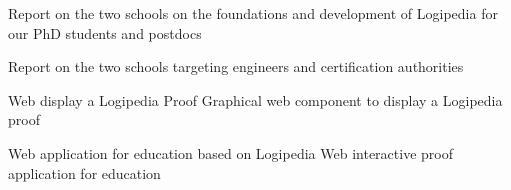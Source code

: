 \begin{workpackage}[id=dissemination,type=MGT,
  short={Dissemination},
  title={Dissemination, communication and exploitation},
  lead=Inr,InrRM=12,BirRM=4,IrtRM=4,ImtRM=2,StrRM=2,ZibRM=14,EduRM=12]
\begin{wpdelivs}
  \begin{wpdeliv}[due=24,miles=???,id=school-second-phd,dissem=PU,nature=R,lead=Bir]{Report on the two schools on the foundations and development of Logipedia for our PhD students and postdocs}
  \end{wpdeliv}


  \begin{wpdeliv}[due=24,miles=???,id=school-second-certif,dissem=PU,nature=R,lead=Irt]{Report on the two schools targeting engineers and certification authorities}
  \end{wpdeliv}


  \begin{wpdeliv}[due=36,miles=???,id=edu-display,dissem=PU,nature=D,lead=Edu]{Web display a Logipedia Proof}
    Graphical web component to display a Logipedia proof
  \end{wpdeliv}

  \begin{wpdeliv}[due=36,miles=???,id=edu-app,dissem=PU,nature=OTHER,lead=Edu]{Web application for education based on Logipedia}
    Web interactive proof application for education
  \end{wpdeliv}

\end{wpdelivs}

\end{workpackage}


